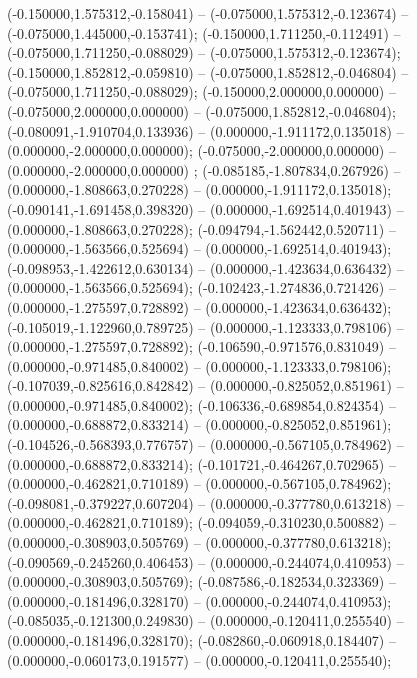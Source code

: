  (-0.150000,1.575312,-0.158041) -- (-0.075000,1.575312,-0.123674) -- (-0.075000,1.445000,-0.153741);
 (-0.150000,1.711250,-0.112491) -- (-0.075000,1.711250,-0.088029) -- (-0.075000,1.575312,-0.123674);
 (-0.150000,1.852812,-0.059810) -- (-0.075000,1.852812,-0.046804) -- (-0.075000,1.711250,-0.088029);
 (-0.150000,2.000000,0.000000) -- (-0.075000,2.000000,0.000000) -- (-0.075000,1.852812,-0.046804);
 (-0.080091,-1.910704,0.133936) -- (0.000000,-1.911172,0.135018) -- (0.000000,-2.000000,0.000000);
 (-0.075000,-2.000000,0.000000) -- (0.000000,-2.000000,0.000000) ;
 (-0.085185,-1.807834,0.267926) -- (0.000000,-1.808663,0.270228) -- (0.000000,-1.911172,0.135018);
 (-0.090141,-1.691458,0.398320) -- (0.000000,-1.692514,0.401943) -- (0.000000,-1.808663,0.270228);
 (-0.094794,-1.562442,0.520711) -- (0.000000,-1.563566,0.525694) -- (0.000000,-1.692514,0.401943);
 (-0.098953,-1.422612,0.630134) -- (0.000000,-1.423634,0.636432) -- (0.000000,-1.563566,0.525694);
 (-0.102423,-1.274836,0.721426) -- (0.000000,-1.275597,0.728892) -- (0.000000,-1.423634,0.636432);
 (-0.105019,-1.122960,0.789725) -- (0.000000,-1.123333,0.798106) -- (0.000000,-1.275597,0.728892);
 (-0.106590,-0.971576,0.831049) -- (0.000000,-0.971485,0.840002) -- (0.000000,-1.123333,0.798106);
 (-0.107039,-0.825616,0.842842) -- (0.000000,-0.825052,0.851961) -- (0.000000,-0.971485,0.840002);
 (-0.106336,-0.689854,0.824354) -- (0.000000,-0.688872,0.833214) -- (0.000000,-0.825052,0.851961);
 (-0.104526,-0.568393,0.776757) -- (0.000000,-0.567105,0.784962) -- (0.000000,-0.688872,0.833214);
 (-0.101721,-0.464267,0.702965) -- (0.000000,-0.462821,0.710189) -- (0.000000,-0.567105,0.784962);
 (-0.098081,-0.379227,0.607204) -- (0.000000,-0.377780,0.613218) -- (0.000000,-0.462821,0.710189);
 (-0.094059,-0.310230,0.500882) -- (0.000000,-0.308903,0.505769) -- (0.000000,-0.377780,0.613218);
 (-0.090569,-0.245260,0.406453) -- (0.000000,-0.244074,0.410953) -- (0.000000,-0.308903,0.505769);
 (-0.087586,-0.182534,0.323369) -- (0.000000,-0.181496,0.328170) -- (0.000000,-0.244074,0.410953);
 (-0.085035,-0.121300,0.249830) -- (0.000000,-0.120411,0.255540) -- (0.000000,-0.181496,0.328170);
 (-0.082860,-0.060918,0.184407) -- (0.000000,-0.060173,0.191577) -- (0.000000,-0.120411,0.255540);
